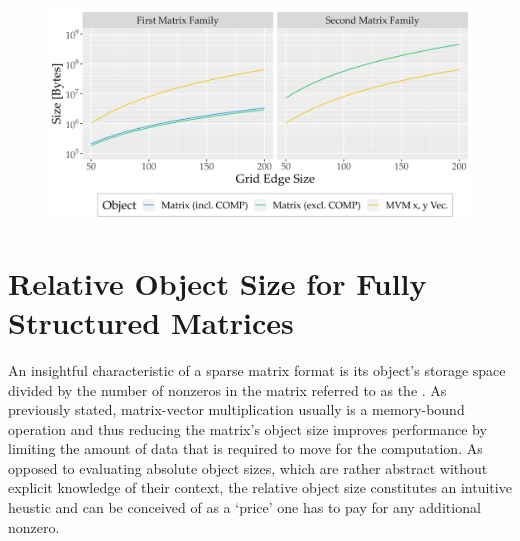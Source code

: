     \begin{figure}[H]
        \centering
        \captionsetup{width=0.9\columnwidth}
        \includegraphics[width=0.9\columnwidth]{assets/test-matrices-object-size.png} %
        \label{fig:test-matrices-object-size}
    \end{figure}

  \section{Relative Object Size for Fully Structured Matrices} \label{sec:rel-object-size-fully-structured}

    An insightful characteristic of a sparse matrix format is its object's storage space divided by the number of
    nonzeros in the matrix referred to as the . As previously stated, matrix-vector
    multiplication usually is a memory-bound operation and thus reducing the matrix's object size improves performance
    by limiting the amount of data that is required to move for the computation. As opposed to evaluating absolute
    object sizes, which are rather abstract without explicit knowledge of their context, the relative object size
    constitutes an intuitive heustic and can be conceived of as a `price' one has to pay for any additional nonzero.

